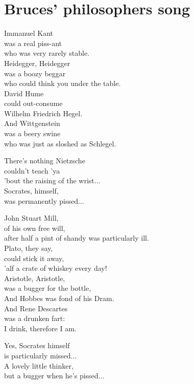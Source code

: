 \section{Bruces' philosophers song}
Immanuel Kant\\
was a real piss-ant\\
who was very rarely stable.\\
Heidegger, Heidegger\\
was a boozy beggar\\
who could think you under the table.\\
David Hume\\
could out-consume\\
Wilhelm Friedrich Hegel.\\
And Wittgenstein\\
was a beery swine\\
who was just as sloshed as Schlegel.

There's nothing Nietzsche\\
couldn't teach 'ya\\
'bout the raising of the wrist...\\
Socrates, himself,\\
was permanently pissed...

John Stuart Mill,\\
of his own free will,\\
after half a pint of shandy was particularly ill.\\
Plato, they say,\\
could stick it away,\\
'alf a crate of whiskey every day!\\
Aristotle, Aristotle,\\
was a bugger for the bottle,\\
And Hobbes was fond of his Dram.\\
And Rene Descartes\\
was a drunken fart:\\
I drink, therefore I am.

Yes, Socrates himself\\
is particularly missed...\\
A lovely little thinker,\\
but a bugger when he's pissed...

